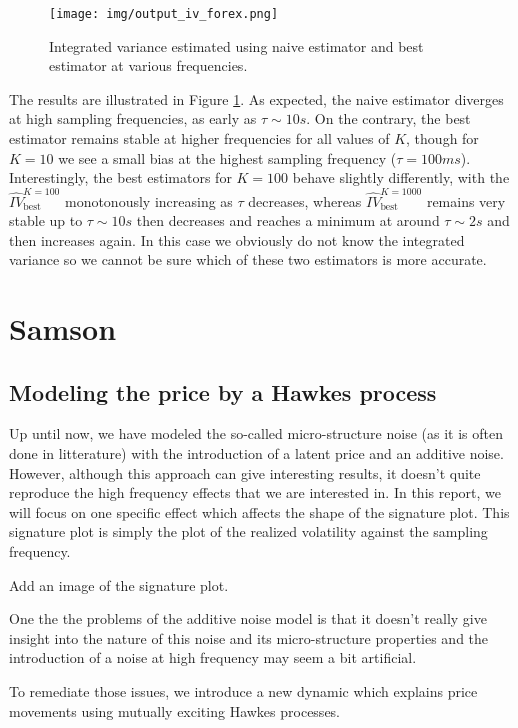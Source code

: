 \documentclass[a4paper,12pt,twoside]{article}
\begin{document}
\begin{figure}[h]
    \centering
    \texttt{[image: img/output\_iv\_forex.png]}
    \caption{Integrated variance estimated using naive estimator and best estimator at various frequencies.}
    \label{fig-IV-forex}
\end{figure}

The results are illustrated in Figure \ref{fig-IV-forex}. As expected, the naive estimator diverges at high sampling frequencies, as early as $\tau\sim10s$. On the contrary, the best estimator remains stable at higher frequencies for all values of $K$, though for $K=10$ we see a small bias at the highest sampling frequency ($\tau=100ms$). Interestingly, the best estimators for $K=100$ behave slightly differently, with the $\hat{IV}_\text{best}^{K=100}$ monotonously increasing as $\tau$ decreases, whereas $\hat{IV}_\text{best}^{K=1000}$ remains very stable up to $\tau\sim10s$ then decreases and reaches a minimum at around $\tau\sim2s$ and then increases again. In this case we obviously do not know the integrated variance so we cannot be sure which of these two estimators is more accurate.


\section{Samson} \label{section-samson}
\subsection{Modeling the price by a Hawkes process}

Up until now, we have modeled the so-called micro-structure noise (as it is often done in litterature) with the introduction of a latent price and an additive noise. 
However, although this approach can give interesting results, it doesn't quite reproduce the high frequency effects that we are interested in. In this report, we will focus on one specific effect which affects the shape of the signature plot. This signature plot is simply the plot of the realized volatility against the sampling frequency.

Add an image of the signature plot.

One the the problems of the additive noise model is that it doesn't really give insight into the nature of this noise and its micro-structure properties and the introduction of a noise at high frequency may seem a bit artificial.

To remediate those issues, we introduce a new dynamic which explains price movements using mutually exciting Hawkes processes.
\end{document}
